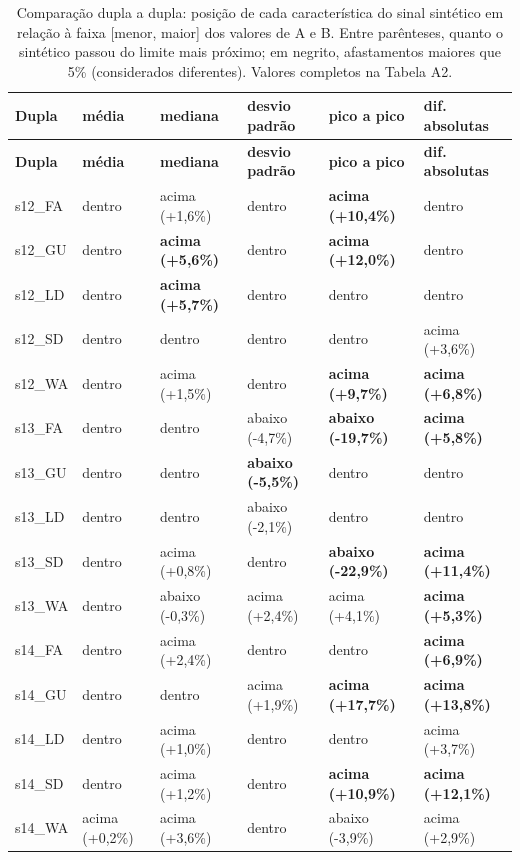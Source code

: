 {\footnotesize
\begin{longtable}{|>{\centering\arraybackslash}p{1.72cm}|>{\centering\arraybackslash}p{2.27cm}|>{\centering\arraybackslash}p{2.27cm}|>{\centering\arraybackslash}p{2.27cm}|>{\centering\arraybackslash}p{2.27cm}|>{\centering\arraybackslash}p{2.50cm}|}
\caption{Comparação dupla a dupla: posição de cada característica do sinal sintético em relação à faixa [menor, maior] dos valores de A e B. Entre parênteses, quanto o sintético passou do limite mais próximo; em negrito, afastamentos maiores que 5\% (considerados diferentes). Valores completos na Tabela A2.}\\
\hline
\textbf{Dupla} & \textbf{média} & \textbf{mediana} & \textbf{desvio padrão} & \textbf{pico a pico} & \textbf{dif. absolutas} \\ \hline
\endfirsthead
\hline
\textbf{Dupla} & \textbf{média} & \textbf{mediana} & \textbf{desvio padrão} & \textbf{pico a pico} & \textbf{dif. absolutas} \\ \hline
\endhead
s12\_FA & dentro & acima (+1,6\%) & dentro & \textbf{acima (+10,4\%)} & dentro \\ \hline
s12\_GU & dentro & \textbf{acima (+5,6\%)} & dentro & \textbf{acima (+12,0\%)} & dentro \\ \hline
s12\_LD & dentro & \textbf{acima (+5,7\%)} & dentro & dentro & dentro \\ \hline
s12\_SD & dentro & dentro & dentro & dentro & acima (+3,6\%) \\ \hline
s12\_WA & dentro & acima (+1,5\%) & dentro & \textbf{acima (+9,7\%)} & \textbf{acima (+6,8\%)} \\ \hline
s13\_FA & dentro & dentro & abaixo (-4,7\%) & \textbf{abaixo (-19,7\%)} & \textbf{acima (+5,8\%)} \\ \hline
s13\_GU & dentro & dentro & \textbf{abaixo (-5,5\%)} & dentro & dentro \\ \hline
s13\_LD & dentro & dentro & abaixo (-2,1\%) & dentro & dentro \\ \hline
s13\_SD & dentro & acima (+0,8\%) & dentro & \textbf{abaixo (-22,9\%)} & \textbf{acima (+11,4\%)} \\ \hline
s13\_WA & dentro & abaixo (-0,3\%) & acima (+2,4\%) & acima (+4,1\%) & \textbf{acima (+5,3\%)} \\ \hline
s14\_FA & dentro & acima (+2,4\%) & dentro & dentro & \textbf{acima (+6,9\%)} \\ \hline
s14\_GU & dentro & dentro & acima (+1,9\%) & \textbf{acima (+17,7\%)} & \textbf{acima (+13,8\%)} \\ \hline
s14\_LD & dentro & acima (+1,0\%) & dentro & dentro & acima (+3,7\%) \\ \hline
s14\_SD & dentro & acima (+1,2\%) & dentro & \textbf{acima (+10,9\%)} & \textbf{acima (+12,1\%)} \\ \hline
s14\_WA & acima (+0,2\%) & acima (+3,6\%) & dentro & abaixo (-3,9\%) & acima (+2,9\%) \\ \hline
\end{longtable}
}

